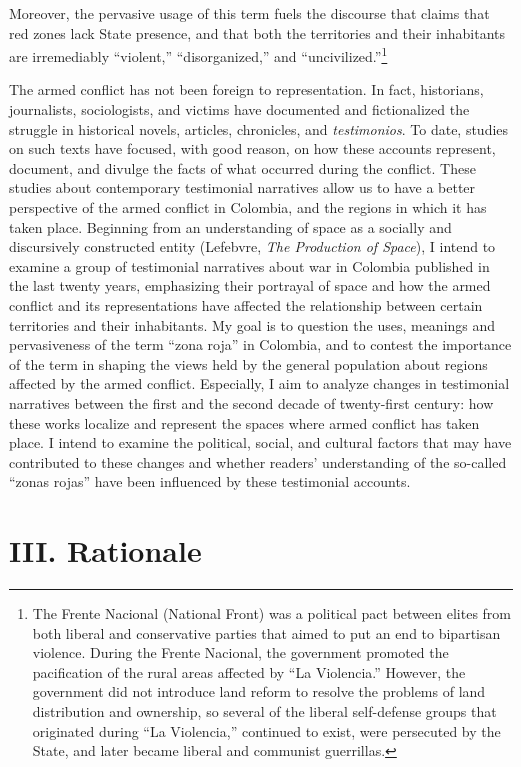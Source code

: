 \documentclass[
  11pt,
,
onecolumn,
openany
]{book}
\begin{document}
Moreover, the pervasive usage of this term fuels the discourse that claims
that red zones lack State presence, and that both the territories and their
inhabitants are irremediably ``violent,'' ``disorganized,'' and
``uncivilized.''\footnote{The Frente Nacional (National Front) was a political
  pact between elites from both liberal and conservative parties that aimed to
  put an end to bipartisan violence. During the Frente Nacional, the
  government promoted the pacification of the rural areas affected by ``La
  Violencia.'' However, the government did not introduce land reform to
  resolve the problems of land distribution and ownership, so several of the
  liberal self-defense groups that originated during ``La Violencia,''
  continued to exist, were persecuted by the State, and later became liberal
  and communist guerrillas.}

The armed conflict has not been foreign to representation. In fact,
historians, journalists, sociologists, and victims have documented and
fictionalized the struggle in historical novels, articles, chronicles, and
\emph{testimonios}. To date, studies on such texts have focused, with good
reason, on how these accounts represent, document, and divulge the facts of
what occurred during the conflict. These studies about contemporary
testimonial narratives allow us to have a better perspective of the armed
conflict in Colombia, and the regions in which it has taken place. Beginning
from an understanding of space as a socially and discursively constructed
entity (Lefebvre, \emph{The Production of Space}), I intend to examine a group
of testimonial narratives about war in Colombia published in the last twenty
years, emphasizing their portrayal of space and how the armed conflict and its
representations have affected the relationship between certain territories and
their inhabitants. My goal is to question the uses, meanings and pervasiveness
of the term ``zona roja'' in Colombia, and to contest the importance of the
term in shaping the views held by the general population about regions
affected by the armed conflict. Especially, I aim to analyze changes in
testimonial narratives between the first and the second decade of twenty-first
century: how these works localize and represent the spaces where armed
conflict has taken place. I intend to examine the political, social, and
cultural factors that may have contributed to these changes and whether
readers' understanding of the so-called ``zonas rojas'' have been influenced
by these testimonial accounts.

\hypertarget{iii.-rationale}{%
\chapter{III. Rationale}\label{iii.-rationale}}
\end{document}
